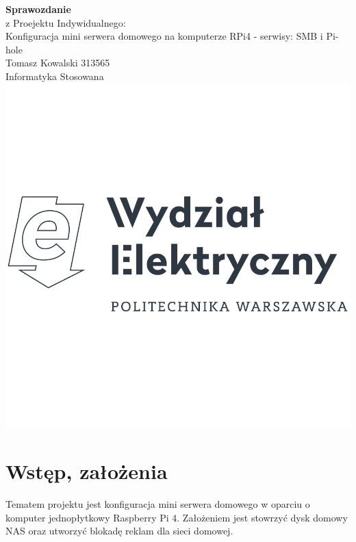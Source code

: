 \documentclass{article}
\begin{document}
\begin{titlepage}
	\begin{center}
     	\vspace*{1cm}
     	\huge\textbf{Sprawozdanie\\}
     	\vspace{0.3cm}
     	\huge{z Proejektu Indywidualnego:\\Konfiguracja mini serwera domowego na komputerze RPi4 - serwisy: SMB i Pi-hole\\}
       	\vspace{0.8cm}
       	\huge{Tomasz Kowalski 313565\\}
            \vspace{0.3cm}
            \huge{Informatyka Stosowana}
       	\vfill
       	\vspace{0.cm}
		\includegraphics[scale=0.5]{EE.png} 
   	\end{center}
\end{titlepage}

\tableofcontents
\clearpage

\section{Wstęp, założenia}
Tematem projektu jest konfiguracja mini serwera domowego w oparciu o komputer jednopłytkowy Raspberry Pi 4. Założeniem jest stowrzyć dysk domowy NAS oraz utworzyć blokadę reklam dla sieci domowej.\\
\end{document}
